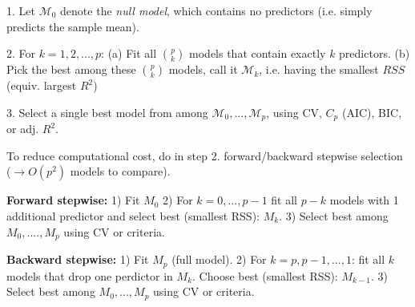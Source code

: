1. Let $\mathcal{M}_0$ denote the \textit{null model}, which contains no predictors (i.e. simply predicts the sample mean).

2. For $k=1,2,...,p$: (a) Fit all $\binom{p}{k}$ models that contain exactly $k$ predictors. (b) Pick the best among these $\binom{p}{k}$ models, call it $\mathcal{M}_k$, i.e. having the smallest $RSS$ (equiv. largest $R^2$)

3. Select a single best model from among $\mathcal{M}_0,..., \mathcal{M}_p$, using CV, $C_p$ (AIC), BIC, or adj. $R^2$.

To reduce computational cost, do in step 2. forward/backward stepwise selection ($\rightarrow O(p^2)$ models to compare).

\textbf{Forward stepwise:} 
1) Fit $M_0$ 
2) For $k=0,...,p-1$ fit all $p-k$ models with 1 additional predictor and select best (smallest RSS): $M_k$. 
3) Select best among $M_0,....,M_p$ using CV or criteria.

\textbf{Backward stepwise:} 
1) Fit $M_p$ (full model). 
2) For $k=p,p-1,...,1$: fit all $k$ models that drop one perdictor in $M_k$. Choose best (smallest RSS): $M_{k-1}$. 
3) Select best among $M_0,...,M_p$ using CV or criteria.

